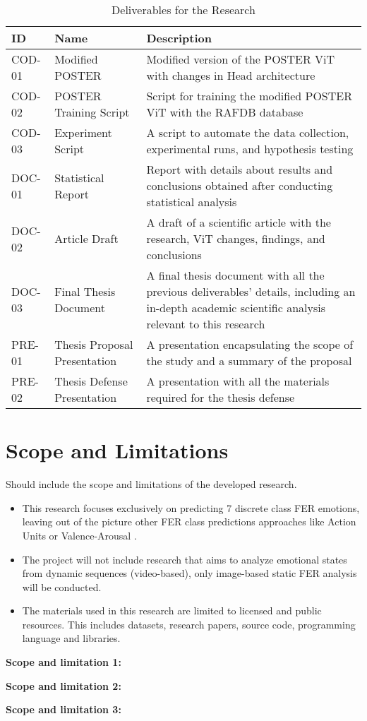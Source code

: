 \renewcommand{\arraystretch}{2.5}
\begin{table}[H]
\label{tb:table_deliverable}
\caption{Deliverables for the Research}
\begin{tabular}{@{}llp{10cm}@{}}
\toprule
\textbf{ID} & \textbf{Name} & \textbf{Description} \\ \midrule
COD-01 & Modified POSTER & 
\parbox[t]{10cm}{Modified version of the POSTER ViT with changes in Head architecture} \\
COD-02 & POSTER Training Script & 
\parbox[t]{10cm}{Script for training the modified POSTER ViT with the RAFDB database} \\
COD-03 & Experiment Script & 
\parbox[t]{10cm}{A script to automate the data collection, experimental runs, and hypothesis testing} \\
DOC-01 & Statistical Report & 
\parbox[t]{10cm}{Report with details about results and conclusions obtained after conducting statistical analysis} \\
DOC-02 & Article Draft & 
\parbox[t]{10cm}{A draft of a scientific article with the research, ViT changes, findings, and conclusions} \\
DOC-03 & Final Thesis Document & 
\parbox[t]{10cm}{A final thesis document with all the previous deliverables' details, including an in-depth academic scientific analysis relevant to this research} \\
PRE-01 & Thesis Proposal Presentation & 
\parbox[t]{10cm}{A presentation encapsulating the scope of the study and a summary of the proposal} \\
PRE-02 & Thesis Defense Presentation & 
\parbox[t]{10cm}{A presentation with all the materials required for the thesis defense} \\ 
\bottomrule
\end{tabular}
\end{table}

\section{Scope and Limitations}

Should include the scope and limitations of the developed research.

\begin{itemize}
\item This research focuses exclusively on predicting 7 discrete class FER emotions, leaving out of the picture other FER class predictions approaches like Action Units or Valence-Arousal \citep{kollias_affect_2021}.

\item The project will not include research that aims to analyze emotional states from dynamic sequences (video-based)\cite{wang_survey_2024}, only image-based static FER analysis will be conducted. 

\item The materials used in this research are limited to licensed and public resources. This includes datasets, research papers, source code, programming language and libraries. 
\end{itemize}

\textbf{Scope and limitation 1:} 

\textbf{Scope and limitation 2:}
 
\textbf{Scope and limitation 3:} 